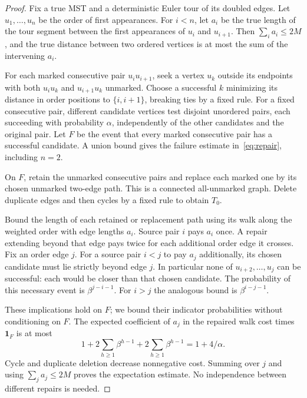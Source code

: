\documentclass[acmlarge,screen,nonacm,11pt]{acmart}
\newcommand{\ind}{\mathbf{1}}
\begin{document}
\begin{proof}
Fix a true MST and a deterministic Euler tour of its doubled edges. Let $u_1,\ldots,u_n$ be the order of first appearances. For $i<n$, let $a_i$ be the true length of the tour segment between the first appearances of $u_i$ and $u_{i+1}$. Then $\sum_i a_i\leq2M$, and the true distance between two ordered vertices is at most the sum of the intervening $a_i$.

For each marked consecutive pair $u_iu_{i+1}$, seek a vertex $u_k$ outside its endpoints with both $u_iu_k$ and $u_{i+1}u_k$ unmarked. Choose a successful $k$ minimizing its distance in order positions to $\{i,i+1\}$, breaking ties by a fixed rule. For a fixed consecutive pair, different candidate vertices test disjoint unordered pairs, each succeeding with probability $\alpha$, independently of the other candidates and the original pair. Let $F$ be the event that every marked consecutive pair has a successful candidate. A union bound gives the failure estimate in~\eqref{eq:repair}, including $n=2$.

On $F$, retain the unmarked consecutive pairs and replace each marked one by its chosen unmarked two-edge path. This is a connected all-unmarked graph. Delete duplicate edges and then cycles by a fixed rule to obtain $T_0$.

Bound the length of each retained or replacement path using its walk along the weighted order with edge lengths $a_i$. Source pair $i$ pays $a_i$ once. A repair extending beyond that edge pays twice for each additional order edge it crosses. Fix an order edge $j$. For a source pair $i<j$ to pay $a_j$ additionally, its chosen candidate must lie strictly beyond edge $j$. In particular none of $u_{i+2},\ldots,u_j$ can be successful: each would be closer than that chosen candidate. The probability of this necessary event is $\beta^{j-i-1}$. For $i>j$ the analogous bound is $\beta^{i-j-1}$.

These implications hold on $F$; we bound their indicator probabilities without conditioning on $F$. The expected coefficient of $a_j$ in the repaired walk cost times $\ind_F$ is at most
\[
 1+2\sum_{h\geq1}\beta^{h-1}
   +2\sum_{h\geq1}\beta^{h-1}=1+4/\alpha.
\]
Cycle and duplicate deletion decrease nonnegative cost. Summing over $j$ and using $\sum_j a_j\leq2M$ proves the expectation estimate. No independence between different repairs is needed.
\end{proof}
\end{document}
